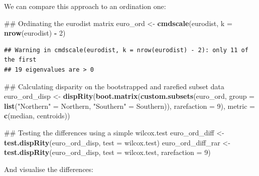 \documentclass[]{book}
\newenvironment{Shaded}{\begin{snugshade}}{\end{snugshade}}
\newcommand{\KeywordTok}[1]{\textcolor[rgb]{0.13,0.29,0.53}{\textbf{#1}}}
\newcommand{\DataTypeTok}[1]{\textcolor[rgb]{0.13,0.29,0.53}{#1}}
\newcommand{\DecValTok}[1]{\textcolor[rgb]{0.00,0.00,0.81}{#1}}
\newcommand{\StringTok}[1]{\textcolor[rgb]{0.31,0.60,0.02}{#1}}
\newcommand{\OperatorTok}[1]{\textcolor[rgb]{0.81,0.36,0.00}{\textbf{#1}}}
\newcommand{\NormalTok}[1]{#1}
\theoremstyle{definition}
\theoremstyle{definition}
\theoremstyle{definition}
\theoremstyle{remark}
\begin{document}
We can compare this approach to an ordination one:

\begin{Shaded}
\begin{Highlighting}[]
\NormalTok{## Ordinating the eurodist matrix}
\NormalTok{euro_ord <-}\StringTok{ }\KeywordTok{cmdscale}\NormalTok{(eurodist, }\DataTypeTok{k =} \KeywordTok{nrow}\NormalTok{(eurodist) }\OperatorTok{-}\StringTok{ }\DecValTok{2}\NormalTok{)}
\end{Highlighting}
\end{Shaded}

\begin{verbatim}
## Warning in cmdscale(eurodist, k = nrow(eurodist) - 2): only 11 of the first
## 19 eigenvalues are > 0
\end{verbatim}

\begin{Shaded}
\begin{Highlighting}[]
\NormalTok{## Calculating disparity on the bootstrapped and rarefied subset data}
\NormalTok{euro_ord_disp <-}\StringTok{ }\KeywordTok{dispRity}\NormalTok{(}\KeywordTok{boot.matrix}\NormalTok{(}\KeywordTok{custom.subsets}\NormalTok{(euro_ord, }\DataTypeTok{group =}
        \KeywordTok{list}\NormalTok{(}\StringTok{"Northern"}\NormalTok{ =}\StringTok{ }\NormalTok{Northern, }\StringTok{"Southern"}\NormalTok{ =}\StringTok{ }\NormalTok{Southern)), }\DataTypeTok{rarefaction =} \DecValTok{9}\NormalTok{),}
        \DataTypeTok{metric =} \KeywordTok{c}\NormalTok{(median, centroids))}

\NormalTok{## Testing the differences using a simple wilcox.test}
\NormalTok{euro_ord_diff <-}\StringTok{ }\KeywordTok{test.dispRity}\NormalTok{(euro_ord_disp, }\DataTypeTok{test =}\NormalTok{ wilcox.test)}
\NormalTok{euro_ord_diff_rar <-}\StringTok{ }\KeywordTok{test.dispRity}\NormalTok{(euro_ord_disp, }\DataTypeTok{test =}\NormalTok{ wilcox.test, }\DataTypeTok{rarefaction =} \DecValTok{9}\NormalTok{)}
\end{Highlighting}
\end{Shaded}

And visualise the differences:
\end{document}
